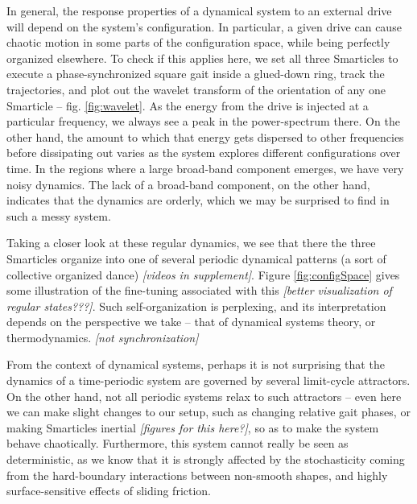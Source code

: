 \documentclass[reprint,prx]{revtex4-1}
\renewcommand{\=}[1]{\stackrel{#1}{=}} %
\renewcommand{\(}{\left (}
\renewcommand{\)}{\right  )}
\renewcommand{\[}{\left [}
\renewcommand{\]}{\right ]}
\newcommand{\<}{\left <}
\renewcommand{\>}{\right >}
\theoremstyle{definition}
\theoremstyle{remark}
\renewcommand{\todo}[1]{\textit{\color{red}[#1]}}
\begin{document}
In general, the response properties of a dynamical system to an external drive will depend on the system's configuration. In particular, a given drive can cause chaotic motion in some parts of the configuration space, while being perfectly organized elsewhere. To check if this applies here, we set all three Smarticles to execute a phase-synchronized square gait inside a glued-down ring, track the trajectories, and plot out the wavelet transform of the orientation of any one Smarticle -- fig. \ref{fig:wavelet}. As the energy from the drive is injected at a particular frequency, we always see a peak in the power-spectrum there. On the other hand, the amount to which that energy gets dispersed to other frequencies before dissipating out varies as the system explores different configurations over time. In the regions where a large broad-band component emerges, we have very noisy dynamics. The lack of a broad-band component, on the other hand, indicates that the dynamics are orderly, which we may be surprised to find in such a messy system. 

Taking a closer look at these regular dynamics, we see that there the three Smarticles organize into one of several periodic dynamical patterns (a sort of collective organized dance) \todo{videos in supplement}. Figure \ref{fig:configSpace} gives some illustration of the fine-tuning associated with this \todo{better visualization of regular states???}. Such self-organization is perplexing, and its interpretation depends on the perspective we take -- that of dynamical systems theory, or thermodynamics.
\todo{not synchronization}



From the context of dynamical systems, perhaps it is not surprising that the dynamics of a time-periodic system are governed by several limit-cycle attractors. On the other hand, not all periodic systems relax to such attractors -- even here we can make slight changes to our setup, such as changing relative gait phases, or making Smarticles inertial \todo{figures for this here?}, so as to make the system behave chaotically. Furthermore, this system cannot really be seen as deterministic, as we know that it is strongly affected by the stochasticity coming from the hard-boundary interactions between non-smooth shapes, and highly surface-sensitive effects of sliding friction.
\end{document}

